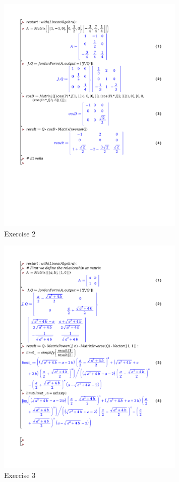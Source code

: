\documentclass[a4paper]{report}
\begin{document}
\begin{figure}[H]
	\centering
	\includegraphics[width=0.8\textwidth]{exercises/wc_3_ex_2.pdf}
	\caption{Exercise 2}
	\label{fig:wc_3_ex_2}
\end{figure}

\begin{figure}[H]
	\centering
	\includegraphics[width=0.8\textwidth]{exercises/wc_3_ex_3.pdf}
	\caption{Exercise 3}
	\label{fig:wc_3_ex_3}
\end{figure}
\end{document}
